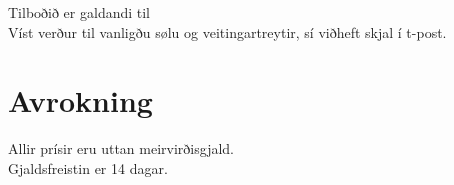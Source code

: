 	Tilboðið er galdandi til \dealExpire \\
	Víst verður til vanligðu sølu og veitingartreytir, sí viðheft skjal í t-post.
	
	
	\section*{Avrokning}
	Allir prísir eru uttan meirvirðisgjald. \\
	Gjaldsfreistin er 14 dagar.

